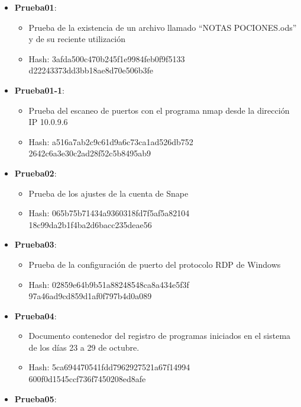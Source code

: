\begin{itemize}
  \item{\textbf{Prueba01}: 
    \begin{itemize}
      \item{Prueba de la existencia de un archivo llamado ``NOTAS POCIONES.ods'' y de su reciente utilización}
      \item{Hash}: 3afda500c470b245f1e9984feb0f9f5133\\d22243373dd3bb18ae8d70e506b3fe
    \end{itemize}}
  \item{\textbf{Prueba01-1}: 
    \begin{itemize}
      \item{Prueba del escaneo de puertos con el programa nmap desde la dirección IP 10.0.9.6}
      \item{Hash}: a516a7ab2c9c61d9a6c73ca1ad526db752\\2642c6a3e30c2ad28f52c5b8495ab9
    \end{itemize}}
  \item{\textbf{Prueba02}: 
    \begin{itemize}
      \item{Prueba de los ajustes de la cuenta de Snape}
      \item{Hash}: 065b75b71434a9360318fd7f5af5a82104\\18c99da2b1f4ba2d6bacc235deae56
    \end{itemize}}
  \item{\textbf{Prueba03}: 
    \begin{itemize}
      \item{Prueba de la configuración de puerto del protocolo RDP de Windows}
      \item{Hash}: 02859e64b9b51a88248548ca8a434e5f3f\\97a46ad9cd859d1af0f797b4d0a089
    \end{itemize}}
  \item{\textbf{Prueba04}: 
    \begin{itemize}
      \item{Documento contenedor del registro de programas iniciados en el sistema de los días 23 a 29 de octubre.}
      \item{Hash}: 5ca694470541fdd7962927521a67f14994\\600f0d1545ccf736f7450208ed8afe
    \end{itemize}}
  \item{\textbf{Prueba05}: 
    \begin{itemize}

\end{itemize}}
\end{itemize}
